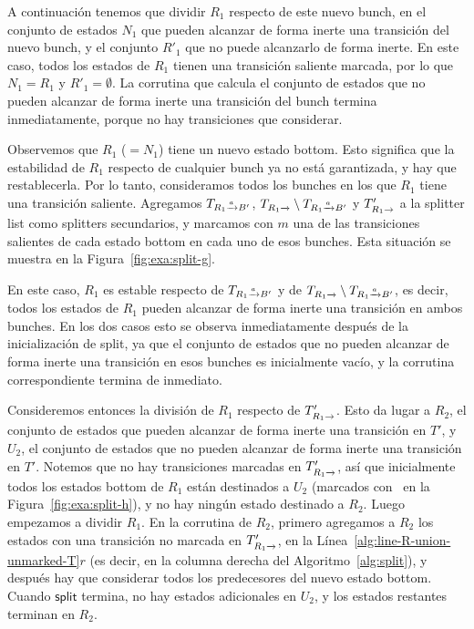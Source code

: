 \begin{example}
A continuación tenemos que dividir $R_1$ respecto de este nuevo bunch, en el conjunto de estados $N_1$ que pueden alcanzar de forma inerte una transición del nuevo bunch, y el conjunto $R'_1$ que no puede alcanzarlo de forma inerte.
En este caso, todos los estados de $R_1$ tienen una transición saliente marcada, por lo que $N_1 = R_1$ y $R'_1 = \emptyset$.
La corrutina que calcula el conjunto de estados que no pueden alcanzar de forma inerte una transición del bunch termina inmediatamente, porque no hay transiciones que considerar.

Observemos que $R_1$ ($=N_1$) tiene un nuevo estado bottom.
Esto significa que la estabilidad de $R_1$ respecto de cualquier bunch ya no está garantizada, y hay que restablecerla.
Por lo tanto, consideramos todos los bunches en los que $R_1$ tiene una transición saliente.
Agregamos $T_{R_1\pijl{a}B'}$, $T_{R_1 \pijl{}} \setminus T_{R_1 \pijl{a} B'}$ y $T'_{R_1\pijl{}}$ a la splitter list como splitters secundarios,
y marcamos con {\color{gray}$m$} una de las transiciones salientes de cada estado bottom en cada uno de esos bunches.
Esta situación se muestra en la Figura~\ref{fig:exa:split-g}.

En este caso, $R_1$ es estable respecto de $T_{R_1\pijl{a}B'}$ y de $T_{R_1 \pijl{}} \setminus T_{R_1 \pijl{a} B'}$, es decir, todos los estados de $R_1$ pueden alcanzar de forma inerte una transición en ambos bunches.
En los dos casos esto se observa inmediatamente después de la inicialización de split,
ya que el conjunto de estados que no pueden alcanzar de forma inerte una transición en esos bunches es inicialmente vacío, y la corrutina correspondiente termina de inmediato.

Consideremos entonces la división de $R_1$ respecto de $T'_{R_1\pijl{}}$. Esto da lugar a $R_2$, el conjunto de estados que pueden alcanzar de forma inerte una transición en $T'$, y $U_2$, el conjunto de estados que no pueden alcanzar de forma inerte una transición en $T'$.
Notemos que no hay transiciones marcadas en $T'_{R_1\pijl{}}$,
así que inicialmente todos los estados bottom de $R_1$ están destinados a $U_2$ (marcados con \bluestatetext\ en la Figura~\ref{fig:exa:split-h}), y no hay ningún estado destinado a $R_2$.
Luego empezamos a dividir $R_1$.
En la corrutina de $R_2$, primero agregamos a $R_2$ los estados con una transición no marcada en $T'_{R_1\pijl{}}$, en la Línea~\ref{alg:line-R-union-unmarked-T}$r$
(es decir, en la columna derecha del Algoritmo~\ref{alg:split}),
y después hay que considerar todos los predecesores del nuevo estado bottom.
Cuando $\mathsf{split}$ termina, no hay estados adicionales en $U_2$, y los estados restantes terminan en $R_2$.


\end{example}
